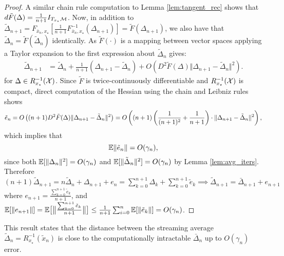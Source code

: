 \begin{proof}
  A similar chain rule computation to Lemma \eqref{lem:tangent_rec} shows that $d \tilde{F}(\Delta) = \frac{1}{n+1}I_{T_{x_\star}\mathcal{M}}$.
  Now, in addition to $\tilde {\Delta}_{n+1} = F_{\bar{x}_n, x_\star}[\frac{1}{n+1} F^{-1}_{\bar{x}_n, x_\star}(\Delta_{n+1})] = \tilde{F}(\Delta_{n+1})$,
  we also have that $\tilde{\Delta}_n = \tilde{F}(\tilde{\Delta}_n)$ identically.
  As $\tilde{F}(\cdot)$ is a mapping between vector spaces applying a Taylor expansion to the first expression about
  $\tilde{\Delta}_n$
  gives:
  \begin{align}
    \tilde{\Delta}_{n+1} & = \tilde {\Delta}_{n} + \frac{1}{n+1}(\Delta_{n+1}-\tilde{\Delta}_n) + O(D^2 \tilde{F}(\Delta) \Vert \Delta_{n+1}-\tilde{\Delta}_n \Vert^2).
  \end{align}
  for $\Delta \in R_{x_\star}^{-1}(\mathcal{X})$.
  Since $\tilde{F}$ is twice-continuously differentiable and $R_{x_\star}^{-1}(\mathcal{X})$ is compact,
  direct computation of the Hessian using the chain and Leibniz rules shows
  \begin{align}
  \tilde{e}_n = O \left((n+1) D^2 \tilde{F}(\Delta) \Vert \Delta_{n+1}-\tilde{\Delta}_n \Vert^2 \right) =
  O\left((n+1) \left(\frac{1}{(n+1)^2} + \frac{1}{n+1} \right) \cdot \Vert \Delta_{n+1} - \tilde{\Delta}_n \Vert^2 \right),
  \notag
  \end{align}
  which implies that
  \[
   \mathbb{E} \Vert \tilde{e}_n \Vert= O({\gamma_n}),\]
  since both $\mathbb{E} [\Vert \Delta_n \Vert^2] = O(\gamma_n)$ and $\mathbb{E} [\Vert \tilde{\Delta}_n\Vert^2] = O(\gamma_n)$ by Lemma \ref{lem:avg_iters}.
  Therefore $ (n+1)  \tilde{\Delta}_{n+1}  = n   \tilde{\Delta}_{n}+ \Delta_{n+1}+e_n = \sum_{k=0}^{n+1}\Delta_k + \sum_{k=0}^{n+1} \tilde e_k \implies
  \tilde{\Delta}_{n+1} = \bar{\Delta}_{n+1} +  e_{n+1}$ where $e_{n+1}=\frac{\sum_{k=0}^{n+1} \tilde e_k}{n+1}$, and $\mathbb{E}[\Vert e_{n+1} \Vert]= \mathbb{E}\big[\big\Vert \frac{\sum_{k=0}^{n+1} \tilde e_k}{n+1} \big\Vert\big] \leq \frac{1}{n+1} \sum_{i=0}^{n} \mathbb{E}[\Vert \tilde e_k \Vert] = O(\gamma_n)$.
\end{proof}
This result states that the distance between the streaming average $\tilde{\Delta}_n = R_{x_\star}^{-1}(\tilde{x}_n)$ is close to the computationally intractable $\bar{\Delta}_n$ up to $O(\gamma_n)$ error.

